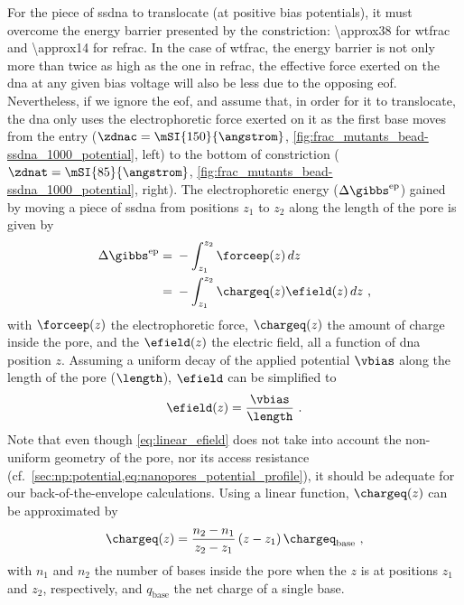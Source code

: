 For the piece of \gls{ssdna} to translocate (at positive bias potentials), it must overcome the energy barrier
presented by the constriction: \SI{\approx38}{\kT} for \gls{wtfrac} and \SI{\approx14}{\kT} for \gls{refrac}.
In the case of \gls{wtfrac}, the energy barrier is not only more than twice as high as the one in
\gls{refrac}, the effective force exerted on the \gls{dna} at any given bias voltage will also be less due to
the opposing \gls{eof}. Nevertheless, if we ignore the \gls{eof}, and assume that, in order for it to
translocate, the \gls{dna} only uses the electrophoretic force exerted on it as the first base moves from the
\cisi{} entry ($\zdnac = \mSI{150}{\angstrom}$, \cref{fig:frac_mutants_bead-ssdna_1000_potential}, left) to
the bottom of \transi{} constriction ($\zdnat = \mSI{85}{\angstrom}$,
\cref{fig:frac_mutants_bead-ssdna_1000_potential}, right). The electrophoretic energy ($\Delta
\gibbs^{\textrm{ep}}$) gained by moving a piece of \gls{ssdna} from positions $z_1$ to $z_2$ along the length
of the pore is given by
%
\begin{align}\label{eq:ep_energy}
  \Delta \gibbs^{\textrm{ep}} ={}& - \int_{z_1}^{z_2} \forceep (z) \,dz \nonumber \\
                              ={}& - \int_{z_1}^{z_2} \chargeq (z) \efield (z) \,dz
  \text{ ,}
\end{align}
%
with $\forceep (z)$ the electrophoretic force, $\chargeq (z)$ the amount of charge inside the pore, and the
$\efield (z)$ the electric field, all a function of \gls{dna} position $z$. Assuming a uniform decay of the
applied potential $\vbias$ along the length of the pore ($\length$), $\efield$ can be simplified to
%
\begin{equation}\label{eq:linear_efield}
  \efield (z) = \dfrac{\vbias}{\length}
  \text{ .}
\end{equation}
%
Note that even though \cref{eq:linear_efield} does not take into account the non-uniform geometry of the pore,
nor its access resistance (cf.~\cref{sec:np:potential,eq:nanopores_potential_profile}), it should be adequate
for our back-of-the-envelope calculations. Using a linear function, $\chargeq (z)$ can be approximated by
%
\begin{equation}\label{eq:ssdna_charge_in_pore}
  \chargeq (z) = 
        \dfrac{ n_2 - n_1 } { z_2 - z_1 } 
        \left( z - z_1 \right) \chargeq_{\textrm{base}}
  \text{ ,}
\end{equation}
%
with $n_1$ and $n_2$ the number of bases inside the pore when the $z$ is at positions $z_1$ and $z_2$,
respectively, and $q_{\textrm{base}}$ the net charge of a single base.

